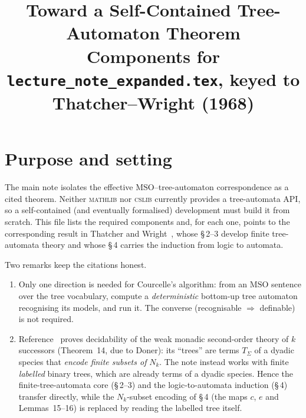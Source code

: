 \documentclass[11pt]{article}
\title{Toward a Self-Contained Tree-Automaton Theorem\\
  \large Components for \texttt{lecture\_note\_expanded.tex}, keyed to
  Thatcher--Wright (1968)}
\author{}
\date{}
\newcommand{\MSO}{\ensuremath{\mathrm{MSO}}}
\begin{document}
\maketitle

\section*{Purpose and setting}

The main note isolates the effective \MSO{}--tree-automaton correspondence as a
cited theorem.  Neither \textsc{mathlib} nor \textsc{cslib} currently provides a
tree-automata API, so a self-contained (and eventually formalised) development
must build it from scratch.  This file lists the required components and, for each
one, points to the corresponding result in Thatcher and Wright~\cite{TW}, whose
\S\,2--3 develop finite tree-automata theory and whose \S\,4 carries the induction
from logic to automata.

Two remarks keep the citations honest.
\begin{enumerate}[leftmargin=*,label=(\arabic*)]
  \item Only one direction is needed for Courcelle's algorithm: from an \MSO{}
    sentence over the tree vocabulary, compute a \emph{deterministic} bottom-up
    tree automaton recognising its models, and run it.  The converse
    (recognisable \(\Rightarrow\) definable) is not required.
  \item Reference~\cite{TW} proves decidability of the weak monadic second-order
    theory of \(k\) successors (Theorem~14, due to Doner): its ``trees'' are terms
    \(T_\Sigma\) of a dyadic species that \emph{encode finite subsets of}
    \(N_k\).  The note instead works with finite \emph{labelled} binary trees,
    which are already terms of a dyadic species.  Hence the finite-tree-automata
    core (\S\,2--3) and the logic-to-automata induction (\S\,4) transfer directly,
    while the \(N_k\)-subset encoding of \S\,4 (the maps \(c\), \(e\) and
    Lemmas~15--16) is replaced by reading the labelled tree itself.
\end{enumerate}
\end{document}
